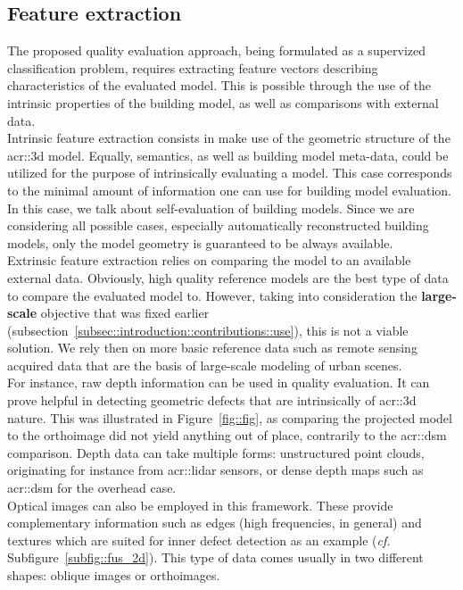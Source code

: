     \subsection{Feature extraction}
        \label{subsec::learned_evaluation::classification::feature_extraction}
        The proposed quality evaluation approach, being formulated as a supervized classification problem, requires extracting feature vectors describing characteristics of the evaluated model.
        This is possible through the use of the intrinsic properties of the building model, as well as comparisons with external data.\\
    
        Intrinsic feature extraction consists in make use of the geometric structure of the \gls{acr::3d} model.
        Equally, semantics, as well as building model meta-data, could be utilized for the purpose of intrinsically evaluating a model.
        This case corresponds to the minimal amount of information one can use for building model evaluation.
        In this case, we talk about self-evaluation of building models.
        Since we are considering all possible cases, especially automatically reconstructed building models, only the model geometry is guaranteed to be always available.\\
    
        Extrinsic feature extraction relies on comparing the model to an available external data.
        Obviously, high quality reference models are the best type of data to compare the evaluated model to.
        However, taking into consideration the \textbf{large-scale} objective that was fixed earlier (subsection~\ref{subsec::introduction::contributions::use}), this is not a viable solution.
        We rely then on more basic reference data such as remote sensing acquired data that are the basis of large-scale modeling of urban scenes.\\
        For instance, raw depth information can be used in quality evaluation.
        It can prove helpful in detecting geometric defects that are intrinsically of \gls{acr::3d} nature.
        This was illustrated in Figure~\ref{fig::fig}, as comparing the projected model to the orthoimage did not yield anything out of place, contrarily to the \gls{acr::dsm} comparison.
        Depth data can take multiple forms: unstructured point clouds, originating for instance from \gls{acr::lidar} sensors, or dense depth maps such as \gls{acr::dsm} for the overhead case.\\
        Optical images can also be employed in this framework.
        These provide complementary information such as edges (high frequencies, in general) and textures which are suited for inner defect detection as an example (\textit{cf.} Subfigure~\ref{subfig::fus_2d}).
        This type of data comes usually in two different shapes: oblique images or orthoimages.
    
